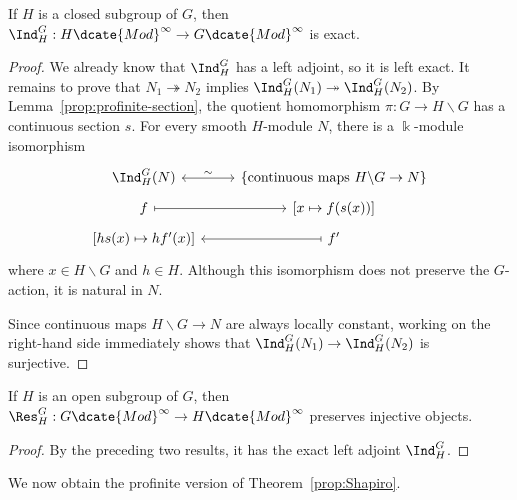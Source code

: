 \begin{lemma}\label{prop:Ind-exact-profinite}
	If $H$ is a closed subgroup of $G$, then
	$\Ind^G_H:H\dcate{Mod}^\infty\to G\dcate{Mod}^\infty$ is exact.
\end{lemma}
\begin{proof}
	We already know that $\Ind^G_H$ has a left adjoint, so it is left exact.
	It remains to prove that $N_1\twoheadrightarrow N_2$ implies
	$\Ind^G_H(N_1)\twoheadrightarrow\Ind^G_H(N_2)$. By
	Lemma~\ref{prop:profinite-section}, the quotient homomorphism
	$\pi:G\to H\backslash G$ has a continuous section $s$. For every smooth
	$H$-module $N$, there is a $\Bbbk$-module isomorphism
	\[\begin{tikzcd}[row sep=tiny]
		\Ind^G_H(N) \arrow[leftrightarrow,r,"\sim"] &
		\{\text{continuous maps }H\backslash G\to N\}\\
		f \arrow[mapsto,r] & {[x\mapsto f(s(x))]}\\
		{[hs(x)\mapsto hf'(x)]} & f' \arrow[mapsto,l]
	\end{tikzcd}\]
	where $x\in H\backslash G$ and $h\in H$. Although this isomorphism does
	not preserve the $G$-action, it is natural in $N$.

	Since continuous maps $H\backslash G\to N$ are always locally constant,
	working on the right-hand side immediately shows that
	$\Ind^G_H(N_1)\to\Ind^G_H(N_2)$ is surjective.
\end{proof}

\begin{corollary}\label{prop:Res-injective-profinite}
	If $H$ is an open subgroup of $G$, then
	$\Res^G_H:G\dcate{Mod}^\infty\to H\dcate{Mod}^\infty$ preserves
	injective objects.
\end{corollary}
\begin{proof}
	By the preceding two results, it has the exact left adjoint $\Ind^G_H$.
\end{proof}

We now obtain the profinite version of Theorem~\ref{prop:Shapiro}.


